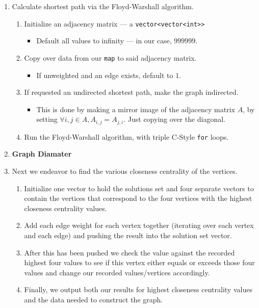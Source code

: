 \documentclass{article}
\newcommand{\shellcmd}[1]{\texttt{\colorbox{gray!30}{#1}}}
\newcommand{\placeholder}[1]{\textbf{\colorbox{red!50}{#1}}}
\begin{document}
\begin{enumerate}
    \item Calculate shortest path via the Floyd-Warshall algorithm.
    \begin{enumerate}
        \item Initialize an adjacency matrix --- a \shellcmd{vector<vector<int>>}
        \begin{itemize}
            \item Default all values to infinity --- in our case, $999999$.
        \end{itemize}
        \item Copy over data from our \shellcmd{map} to said adjacency matrix.
        \begin{itemize}
            \item If unweighted and an edge exists, default to $1$.
        \end{itemize}
        \item If requested an undirected shortest path, make the graph indirected.
        \begin{itemize}
            \item This is done by making a mirror image of the adjacency matrix $A$, by setting $\forall i, j \in A, A_{i, j} = A_{j, i}$. Just copying over the diagonal.
        \end{itemize}
        \item Run the Floyd-Warshall algorithm, with triple C-Style \shellcmd{for} loops.
    \end{enumerate}

    \item \placeholder{Graph Diamater}

    \item Next we endeavor to find the various closeness centrality of the vertices.
    \begin{enumerate}
        \item Initialize one vector to hold the solutions set and four separate vectors to contain the vertices that correspond to the four vertices with the highest closeness centrality values.
        \item Add each edge weight for each vertex together (iterating over each vertex and each edge) and pushing the result into the solution set vector.
        \item After this has been pushed we check the value against the recorded highest four values to see if this vertex either equals or exceeds those four values and change our recorded values/vertices accordingly.
        \item Finally, we output both our results for highest closeness centrality values and the data needed to construct the graph.
     \end{enumerate}

\end{enumerate}
\end{document}
